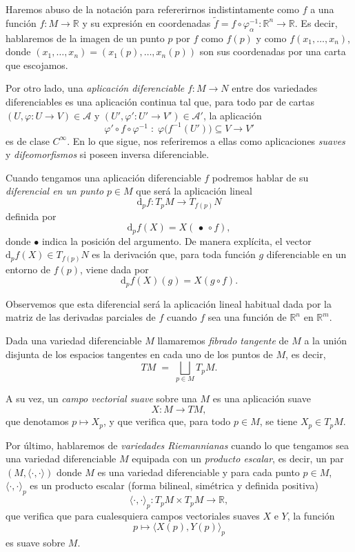 Haremos abuso de la notación para refererirnos indistintamente como $f$ a una función $f:M\to \mathbb{R}$ y su expresión en coordenadas $\tilde{f} = f\circ\varphi_{\alpha}^{-1} : \mathbb{R}^n \to \mathbb{R}$. Es decir, hablaremos de la imagen de un punto $p$ por $f$ como $f(p)$ y como $f(x_1,\dots,x_n)$, donde $(x_1,\dots,x_n)=(x_1(p),\dots,x_n(p))$ son sus coordenadas por una carta que escojamos. 

\bigskip

Por otro lado, una \textit{aplicación diferenciable} $f \colon M \to N$ entre dos variedades diferenciables es una aplicación continua tal que, para todo par de cartas
$(U,\varphi \colon U \to V) \in \mathcal A$ y $(U',\varphi' \colon U' \to V') \in \mathcal A'$, la aplicación
\[
\varphi' \circ f \circ \varphi^{-1}
\;:\;
\varphi\bigl(f^{-1}(U')\bigr) \subseteq V
\longrightarrow V'
\]
es de clase $C^\infty$. En lo que sigue, nos referiremos a ellas como aplicaciones \textit{suaves} y \textit{difeomorfismos} si poseen inversa diferenciable.

\bigskip

Cuando tengamos una aplicación diferenciable $f$ podremos hablar de su \textit{diferencial en un punto} $p \in M$ que será la aplicación lineal
\[
\mathrm d_p f \colon T_p M \longrightarrow T_{f(p)} N
\]
definida por
\[
\mathrm d_p f(X) = X(\,\bullet\, \circ f),
\]
donde $\bullet$ indica la posición del argumento. De manera explícita, el vector $\mathrm d_p f(X) \in T_{f(p)}N$ es la derivación  que, para toda función $g$ diferenciable en un entorno de $f(p)$, viene dada por
\[
\mathrm d_p f(X)(g) = X(g \circ f).
\]

Observemos que esta diferencial será la aplicación lineal habitual dada por la matriz de las derivadas parciales de $f$ cuando $f$ sea una función de $\mathbb{R}^n$ en $\mathbb{R}^m$.

\bigskip

Dada una variedad diferenciable $M$ llamaremos \textit{fibrado tangente} de $M$ a la unión disjunta
de los espacios tangentes en cada uno de los puntos de $M$, es decir,
\[
TM \;=\; \bigsqcup_{p \in M} T_pM.
\]

A su vez, un \textit{campo vectorial suave} sobre una $M$ es una aplicación suave
\[
X \colon M \to TM,
\]
que denotamos $p \mapsto X_p$, y que verifica que, para todo $p \in M$, se tiene $X_p \in T_pM$.

\bigskip

Por último, hablaremos de \textit{variedades Riemannianas} cuando lo que tengamos sea una variedad diferenciable $M$ equipada con un \textit{producto escalar}, es decir, un par $(M,\langle\cdot,\cdot\rangle)$ donde $M$ es una variedad diferenciable y para cada punto $p \in M$, $\langle\cdot,\cdot\rangle_p$ es un producto escalar (forma bilineal, simétrica y definida positiva)
  \[
    \langle\cdot,\cdot\rangle_p \colon T_pM \times T_pM \to \mathbb{R},
  \]
que verifica que para cualesquiera campos vectoriales suaves $X$ e $Y$, la función
    \[
      p \mapsto \langle X(p), Y(p) \rangle_p
    \]
    es suave sobre $M$.

